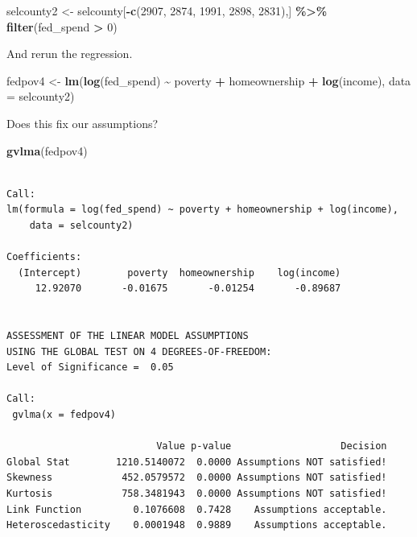 \documentclass[
]{book}
\makeatletter
\newenvironment{Shaded}{\begin{snugshade}}{\end{snugshade}}
\newcommand{\AttributeTok}[1]{\textcolor[rgb]{0.27,0.27,0.27}{#1}}
\newcommand{\DecValTok}[1]{\textcolor[rgb]{0.06,0.06,0.06}{#1}}
\newcommand{\FunctionTok}[1]{\textcolor[rgb]{0.27,0.27,0.27}{\textbf{#1}}}
\newcommand{\NormalTok}[1]{#1}
\newcommand{\OtherTok}[1]{\textcolor[rgb]{0.37,0.37,0.37}{#1}}
\newcommand{\SpecialCharTok}[1]{\textcolor[rgb]{0.43,0.43,0.43}{\textbf{#1}}}
\newenvironment{kframe}{%
\medskip{}
\setlength{\fboxsep}{.8em}
 \def\at@end@of@kframe{}%
 \ifinner\ifhmode%
  \def\at@end@of@kframe{\end{minipage}}%
  \begin{minipage}{\columnwidth}%
 \fi\fi%
 \def\FrameCommand##1{\hskip\@totalleftmargin \hskip-\fboxsep
 \colorbox{shadecolor}{##1}\hskip-\fboxsep
     \hskip-\linewidth \hskip-\@totalleftmargin \hskip\columnwidth}%
 \MakeFramed {\advance\hsize-\width
   \@totalleftmargin\z@ \linewidth\hsize
   \@setminipage}}%
 {\par\unskip\endMakeFramed%
 \at@end@of@kframe}
\renewenvironment{Shaded}{\begin{kframe}}{\end{kframe}}
\makeatother
\begin{document}
\begin{Shaded}
\begin{Highlighting}[]
\NormalTok{selcounty2 }\OtherTok{\textless{}{-}}\NormalTok{ selcounty[}\SpecialCharTok{{-}}\FunctionTok{c}\NormalTok{(}\DecValTok{2907}\NormalTok{, }\DecValTok{2874}\NormalTok{, }\DecValTok{1991}\NormalTok{, }\DecValTok{2898}\NormalTok{, }\DecValTok{2831}\NormalTok{),] }\SpecialCharTok{\%\textgreater{}\%} 
  \FunctionTok{filter}\NormalTok{(fed\_spend }\SpecialCharTok{\textgreater{}} \DecValTok{0}\NormalTok{)}
\end{Highlighting}
\end{Shaded}

And rerun the regression.

\begin{Shaded}
\begin{Highlighting}[]
\NormalTok{fedpov4 }\OtherTok{\textless{}{-}} \FunctionTok{lm}\NormalTok{(}\FunctionTok{log}\NormalTok{(fed\_spend) }\SpecialCharTok{\textasciitilde{}}\NormalTok{ poverty }\SpecialCharTok{+}\NormalTok{ homeownership }\SpecialCharTok{+} \FunctionTok{log}\NormalTok{(income), }
              \AttributeTok{data =}\NormalTok{ selcounty2)}
\end{Highlighting}
\end{Shaded}

Does this fix our assumptions?

\begin{Shaded}
\begin{Highlighting}[]
\FunctionTok{gvlma}\NormalTok{(fedpov4)}
\end{Highlighting}
\end{Shaded}

\begin{verbatim}

Call:
lm(formula = log(fed_spend) ~ poverty + homeownership + log(income), 
    data = selcounty2)

Coefficients:
  (Intercept)        poverty  homeownership    log(income)  
     12.92070       -0.01675       -0.01254       -0.89687  


ASSESSMENT OF THE LINEAR MODEL ASSUMPTIONS
USING THE GLOBAL TEST ON 4 DEGREES-OF-FREEDOM:
Level of Significance =  0.05 

Call:
 gvlma(x = fedpov4) 

                          Value p-value                   Decision
Global Stat        1210.5140072  0.0000 Assumptions NOT satisfied!
Skewness            452.0579572  0.0000 Assumptions NOT satisfied!
Kurtosis            758.3481943  0.0000 Assumptions NOT satisfied!
Link Function         0.1076608  0.7428    Assumptions acceptable.
Heteroscedasticity    0.0001948  0.9889    Assumptions acceptable.
\end{verbatim}
\end{document}
